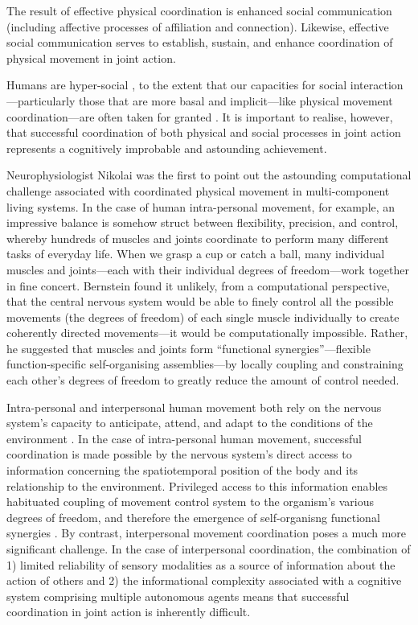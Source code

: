\begin{CJK}{UTF8}{gbsn}
The result of effective physical coordination is enhanced social communication (including affective processes of affiliation and connection).  Likewise, effective social communication serves to establish, sustain, and enhance coordination of physical movement in joint action.






Humans are hyper-social \citep{Tomasello2012a}, to the extent that our capacities for social interaction---particularly those that are more basal and implicit---like physical movement coordination---are often taken for granted \citep{Wheatley2016}.  It is important to realise, however, that successful coordination of both physical and social processes in joint action represents a cognitively improbable and astounding achievement.

Neurophysiologist Nikolai \textcite{Bernstein1967} was the first to point out the astounding computational challenge associated with coordinated physical movement in multi-component living systems.  In the case of human intra-personal movement, for example, an impressive balance is somehow struct between flexibility, precision, and control, whereby hundreds of muscles and joints coordinate to perform many different tasks of everyday life.  When we grasp a cup or catch a ball, many individual muscles and joints---each with their individual degrees of freedom---work together in fine concert.  Bernstein found it unlikely, from a computational perspective, that the central nervous system would be able to finely control all the possible movements (the degrees of freedom) of each single muscle individually to create coherently directed movements---it would be computationally impossible.  Rather, he suggested that muscles and joints form  ``functional synergies''---flexible function-specific self-organising assemblies---by locally coupling and constraining each other’s degrees of freedom to greatly reduce the amount of control needed.

Intra-personal and interpersonal human movement both rely on the nervous system’s capacity to anticipate, attend, and adapt to the conditions of the environment \citep{Keller2014}.  In the case of intra-personal human movement, successful coordination is made possible by the nervous system's direct access to information concerning the spatiotemporal position of the body and its relationship to the environment.  Privileged access to this information enables habituated coupling of movement control system to the organism's various degrees of freedom, and therefore the emergence of self-organisng functional synergies \citep{Riley2011}.  By contrast, interpersonal movement coordination poses a much more significant challenge.  In the case of interpersonal coordination, the combination of 1) limited reliability of sensory modalities as a source of information about the action of others \citep{Wilson2005,Wolpert2003,Frith2007} and 2) the informational complexity associated with a cognitive system comprising multiple autonomous agents \citep[each with their own movement degrees of freedom; see][]{Turvey1978} means that successful coordination in joint action is inherently difficult.


\end{CJK}
